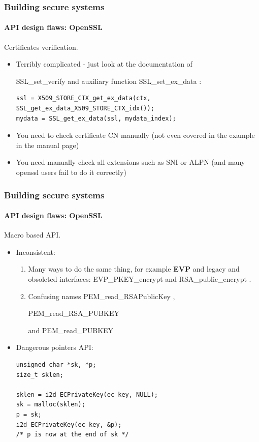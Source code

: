 \documentclass[11pt,t]{beamer}
\newcommand{\funcname}[1]{
	{\color{yellow!30} #1}
}
\begin{document}
\begin{frame}[fragile]
\frametitle{Building secure systems}
\framesubtitle{API design flaws: OpenSSL}
Certificates verification.
\begin{itemize}
\item Terribly complicated - just look at the documentation of 
\funcname{SSL\_set\_verify} and auxiliary function \funcname{SSL\_set\_ex\_data}:
\begin{tiny}
\begin{verbatim}
ssl = X509_STORE_CTX_get_ex_data(ctx, SSL_get_ex_data_X509_STORE_CTX_idx());
mydata = SSL_get_ex_data(ssl, mydata_index);
\end{verbatim}
\end{tiny}
\item You need to check certificate CN manually (not even covered in the example in 
the manual page)
\item You need manually check all extensions such as SNI or ALPN (and many openssl users 
fail to do it correctly)
\end{itemize}
\end{frame}

\begin{frame}[fragile]
\frametitle{Building secure systems}
\framesubtitle{API design flaws: OpenSSL}
Macro based API.
\begin{itemize}
\item Inconsistent: 
\begin{enumerate}
\item Many ways to do the same thing, for example \textbf{EVP} and legacy and obsoleted 
interfaces: \funcname{EVP\_PKEY\_encrypt} and \funcname{RSA\_public\_encrypt}.
\item Confusing names \funcname{PEM\_read\_RSAPublicKey}, 
\funcname{PEM\_read\_RSA\_PUBKEY} 
and \funcname{PEM\_read\_PUBKEY}
\end{enumerate}
\item Dangerous pointers API:
\begin{tiny}
\begin{verbatim}
unsigned char *sk, *p;
size_t sklen;

sklen = i2d_ECPrivateKey(ec_key, NULL);
sk = malloc(sklen);
p = sk;
i2d_ECPrivateKey(ec_key, &p);
/* p is now at the end of sk */
\end{verbatim}
\end{tiny}
\end{itemize}
\end{frame}
\end{document}
